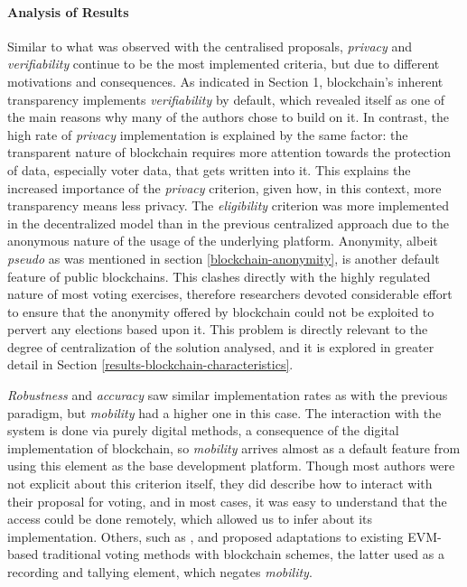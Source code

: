 \documentclass[../access.tex]{subfiles}
\begin{document}
\paragraph{Analysis of Results}
	\label{analysis_results_table3}
	Similar to what was observed with the centralised proposals, \textit{privacy} and \textit{verifiability} continue to be the most implemented criteria, but due to different motivations and consequences. As indicated in Section 1, blockchain's inherent transparency implements \textit{verifiability} by default, which revealed itself as one of the main reasons why many of the authors chose to build on it. In contrast, the high rate of \textit{privacy} implementation is explained by the same factor: the transparent nature of blockchain requires more attention towards the protection of data, especially voter data, that gets written into it. This explains the increased importance of the \textit{privacy} criterion, given how, in this context, more transparency means less privacy. The \textit{eligibility} criterion was more implemented in the decentralized model than in the previous centralized approach due to the anonymous nature of the usage of the underlying platform. Anonymity, albeit \textit{pseudo} as was mentioned in section \ref{blockchain-anonymity}, is another default feature of public blockchains. This clashes directly with the highly regulated nature of most voting exercises, therefore researchers devoted considerable effort to ensure that the anonymity offered by blockchain could not be exploited to pervert any elections based upon it. This problem is directly relevant to the degree of centralization of the solution analysed, and it is explored in greater detail in Section \ref{results-blockchain-characteristics}.
	\par
    \textit{Robustness} and \textit{accuracy} saw similar implementation rates as with the previous paradigm, but \textit{mobility} had a higher one in this case. The interaction with the system is done via purely digital methods, a consequence of the digital implementation of blockchain, so \textit{mobility} arrives almost as a default feature from using this element as the base development platform. Though most authors were not explicit about this criterion itself, they did describe how to interact with their proposal for voting, and in most cases, it was easy to understand that the access could be done remotely, which allowed us to infer about its implementation. Others, such as \cite{Seftyanto2019}, \cite{Alvi2022} and \cite{Bosri2019} proposed adaptations to existing EVM-based traditional voting methods with blockchain schemes, the latter used as a recording and tallying element, which negates \textit{mobility}.
\end{document}
